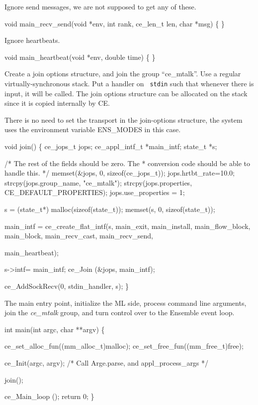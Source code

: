 Ignore send messages, we are not supposed to get any of these.
\begin{codebox}
void main_recv_send(void *env, int rank, ce_len_t len, char *msg) \{
\}
\end{codebox}

Ignore heartbeats.
\begin{codebox}
void main_heartbeat(void *env, double time) \{ \}
\end{codebox}


Create a join options structure, and join the group ``ce\_mtalk''.
Use a regular virtually-synchronous stack. Put a handler on {\tt
stdin} such that whenever there is input, it will be called. 
The join options structure can be allocated on the stack since it is
copied internally by CE. 

There is no need to set the transport in the join-options structure,
the system uses the environment variable ENS\_MODES in this case.
\begin{codebox}
void join() \{
    ce_jops_t jops; 
    ce_appl_intf_t *main_intf;
    state_t *s;
    
    /* The rest of the fields should be zero. The
     * conversion code should be able to handle this. 
     */
    memset(&jops, 0, sizeof(ce_jops_t));
    jops.hrtbt_rate=10.0;
    strcpy(jops.group_name, "ce_mtalk");
    strcpy(jops.properties, CE_DEFAULT_PROPERTIES);
    jops.use_properties = 1;
    
    s = (state_t*) malloc(sizeof(state_t));
    memset(s, 0, sizeof(state_t));
    
    main_intf = ce_create_flat_intf(s,
				    main_exit, main_install, main_flow_block,
				    main_block, main_recv_cast, main_recv_send,
				    
				    main_heartbeat);
    
    s->intf= main_intf;
    ce_Join (&jops, main_intf);
    
    ce_AddSockRecv(0, stdin_handler, s);
\}
\end{codebox}

The main entry point, initialize the ML side, process command line 
arguments, join the {\it ce\_mtalk} group, and turn control over
to the Ensemble event loop.
\begin{codebox}
int main(int argc, char **argv) \{
  
  ce_set_alloc_fun((mm_alloc_t)malloc);
  ce_set_free_fun((mm_free_t)free);

  ce_Init(argc, argv); /* Call Arge.parse, and appl_process_args */

  join();
  
  ce_Main_loop ();
  return 0;
\}
\end{codebox}

